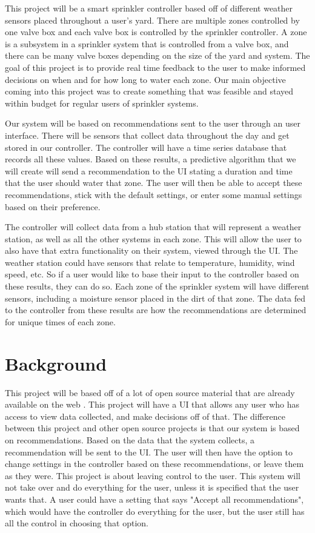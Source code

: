 \documentclass[letterpaper, 10 pt, conference]{ieeeconf}  %
\begin{document}
This project will be a smart sprinkler controller based off of different weather sensors placed throughout a user's yard. There are multiple zones controlled by one valve box and each valve box is controlled by the sprinkler controller. A zone is a subsystem in a sprinkler system that is controlled from a valve box, and there can be many valve boxes depending on the size of the yard and system. The goal of this project is to provide real time feedback to the user to make informed decisions on when and for how long to water each zone. Our main objective coming into this project was to create something that was feasible and stayed within budget for regular users of sprinkler systems.

Our system will be based on recommendations sent to the user through an user interface. There will be sensors that collect data throughout the day and get stored in our controller. The controller will have a time series database that records all these values. Based on these results, a predictive algorithm that we will create will send a recommendation to the UI stating a duration and time that the user should water that zone. The user will then be able to accept these recommendations, stick with the default settings, or enter some manual settings based on their preference. 

The controller will collect data from a hub station that will represent a weather station, as well as all the other systems in each zone. This will allow the user to also have that extra functionality on their system, viewed through the UI. The weather station could have sensors that relate to temperature, humidity, wind speed, etc. So if a user would like to base their input to the controller based on these results, they can do so. Each zone of the sprinkler system will have different sensors, including a moisture sensor placed in the dirt of that zone. The data fed to the controller from these results are how the recommendations are determined for unique times of each zone.

\section{Background}
This project will be based off of a lot of open source material that are already available on the web \cite{SIP}. This project will have a UI that allows any user who has access to view data collected, and make decisions off of that. The difference between this project and other open source projects is that our system is based on recommendations. Based on the data that the system collects, a recommendation will be sent to the UI. The user will then have the option to change settings in the controller based on these recommendations, or leave them as they were. This project is about leaving control to the user. This system will not take over and do everything for the user, unless it is specified that the user wants that. A user could have a setting that says "Accept all recommendations", which would have the controller do everything for the user, but the user still has all the control in choosing that option. 
\end{document}
